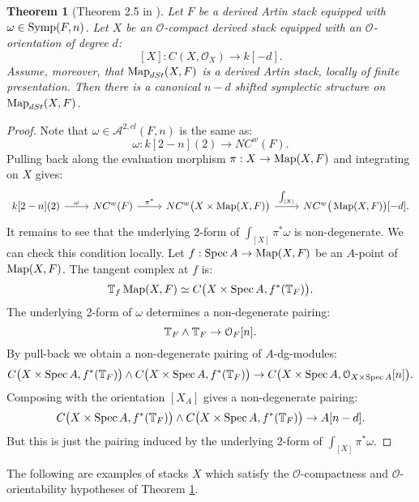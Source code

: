 \documentclass[10pt,a4paper,reqno,oneside]{book} %
\theoremstyle{plain}
\newtheorem{thm}{Theorem}[section]
\theoremstyle{definition}
\theoremstyle{remark}
\numberwithin{equation}{section}
\begin{document}
\begin{thm}[Theorem 2.5 in \cite{PTVV}]
\label{thm:symp_map}
Let $F$ be a derived Artin stack equipped with $\omega \in \operatorname{Symp}(F,n)$. Let $X$ be an $\mathcal{O}$-compact derived stack
equipped with an $\mathcal{O}$-orientation of degree $d$:
\[	[X] : C(X,\mathcal{O}_X) \to k[-d].	\]
Assume, moreover, that $\operatorname{Map}_{dSt}(X,F)$ is a derived Artin stack, locally of finite presentation. Then there is a canonical
$n-d$ shifted symplectic structure on $\operatorname{Map}_{dSt}(X,F)$.
\end{thm}

\begin{proof}
Note that $\omega \in \mathcal{A}^{2,cl}(F,n)$ is the same as:
\[	\omega : k[2-n](2) \to NC^w(F) .	\]
Pulling back along the evaluation morphism $\pi : X \to \operatorname{Map}(X,F)$ and integrating on $X$ gives:
\[
\begin{tikzcd}
k[2-n](2) \arrow{r}{\omega} & NC^w(F) \arrow{r}{\pi^*} & NC^w\big(X\times \Map(X,F)\big) \arrow{r}{\int_{[X]}} &
NC^w\big(\Map(X,F)\big)[-d] .
\end{tikzcd}
\]
It remains to see that the underlying 2-form of $\int_{[X]} \pi^* \omega$ is non-degenerate. We can check
this condition locally. Let $f : \operatorname{Spec} A \to \operatorname{Map}(X,F)$ be an $A$-point of $\operatorname{Map}(X,F)$. The tangent complex at $f$ is:
\[	\mathbb T_f \operatorname{Map}(X,F) \simeq C\big(X \times \operatorname{Spec} A, f^*(\mathbb T_F)\big).	\]
The underlying 2-form of $\omega$ determines a non-degenerate pairing:
\[	\mathbb T_F \wedge \mathbb T_F \to \mathcal{O}_F[n].	\]
By pull-back we obtain a non-degenerate pairing of $A$-dg-modules:
\[	C\big(X \times \operatorname{Spec} A, f^*(\mathbb T_F)\big) \wedge C\big(X \times \operatorname{Spec} A, f^*(\mathbb T_F)\big) \to C\big(X \times \operatorname{Spec} A,
\mathcal{O}_{X\times \operatorname{Spec} A}[n]\big) .	\]
Composing with the orientation $[X_A]$ gives a non-degenerate pairing:
\[	C\big(X \times \operatorname{Spec} A, f^*(\mathbb T_F)\big) \wedge C\big(X \times \operatorname{Spec} A, f^*(\mathbb T_F)\big) \to A[n-d].	\]
But this is just the pairing induced by the underlying 2-form of $\int_{[X]} \pi^*\omega$.
\end{proof}

The following are examples of stacks $X$ which satisfy the $\mathcal{O}$-compactness and $\mathcal{O}$-orientability
hypotheses of Theorem \ref{thm:symp_map}.
\end{document}
